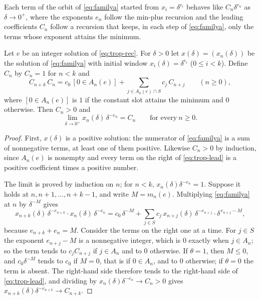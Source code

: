 Each term of the orbit of \eqref{eq:familya} started from
$x_i=\delta^{e_i}$ behaves like $C_n\delta^{e_n}$ as $\delta\to0^+$, where the
exponents $e_n$ follow the min-plus recursion and the leading coefficients $C_n$
follow a recursion that keeps, in each step of \eqref{eq:familya}, only the
terms whose exponent attains the minimum.

\begin{theorem}
\label{thm:leading}
Let $e$ be an integer solution of \eqref{eq:trop-rec}. For $\delta>0$ let
$x(\delta)=(x_n(\delta))$ be the solution of \eqref{eq:familya} with initial
window $x_i(\delta)=\delta^{e_i}$ ($0\le i<k$). Define $C_n$ by $C_n=1$ for $n<k$
and
\begin{equation}
C_{n+k}\,C_n=c_0\,[0\in A_n(e)]+\sum_{j\in A_n(e)\cap S}c_j\,C_{n+j}
\qquad(n\ge0),
\label{eq:trop-lead}
\end{equation}
where $[0\in A_n(e)]$ is $1$ if the constant slot attains the minimum and $0$
otherwise. Then $C_n>0$ and
\[
\lim_{\delta\to0^+}x_n(\delta)\,\delta^{-e_n}=C_n\qquad\text{for every}\ n\ge0.
\]
\end{theorem}

\begin{proof}
First, $x(\delta)$ is a positive solution: the numerator of \eqref{eq:familya}
is a sum of nonnegative terms, at least one of them positive. Likewise
$C_n>0$ by induction, since $A_n(e)$ is nonempty and every term on the right of
\eqref{eq:trop-lead} is a positive coefficient times a positive number.

The limit is proved by induction on $n$; for $n<k$, $x_n(\delta)\delta^{-e_n}=1$.
Suppose it holds at $n,n+1,\dots,n+k-1$, and write $M=m_n(e)$. Multiplying
\eqref{eq:familya} at $n$ by $\delta^{-M}$ gives
\[
x_{n+k}(\delta)\,\delta^{-e_{n+k}}\cdot x_n(\delta)\,\delta^{-e_n}
=c_0\,\delta^{-M}+\sum_{j\in S}c_j\,x_{n+j}(\delta)\,\delta^{-e_{n+j}}\cdot
\delta^{\,e_{n+j}-M},
\]
because $e_{n+k}+e_n=M$. Consider the terms on the right one at a time. For
$j\in S$ the exponent $e_{n+j}-M$ is a nonnegative integer, which is $0$ exactly
when $j\in A_n$; so the term tends to $c_jC_{n+j}$ if $j\in A_n$ and to $0$
otherwise. If $\theta=1$, then $M\le0$, and $c_0\delta^{-M}$ tends to $c_0$ if
$M=0$, that is if $0\in A_n$, and to $0$ otherwise; if $\theta=0$ the term is
absent. The right-hand side therefore tends to the right-hand side of
\eqref{eq:trop-lead}, and dividing by $x_n(\delta)\delta^{-e_n}\to C_n>0$ gives
$x_{n+k}(\delta)\delta^{-e_{n+k}}\to C_{n+k}$.
\end{proof}


